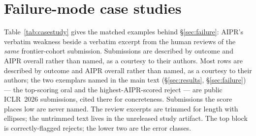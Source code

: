 \begin{table}[h]
  \centering
  \caption{Direct (GPT-5.4) vs.\ AIPR (GPT-5.4) on the frontier
  cohort (same model, same PDF): discrimination (AUROC), accept/reject agreement
  at AIPR@60 (balanced accuracy), and run-to-run reliability (median within-paper
  SD).}
  \label{tab:naive}
  
\end{table}

\section{Failure-mode case studies}
\label{app:cases}
Table~\ref{tab:casestudy} gives the matched examples behind \S\ref{sec:failure}:
AIPR's verbatim weakness beside a verbatim excerpt from the human reviews of the
\emph{same} frontier-cohort submission. \ifanonymous Submissions are described by
outcome and AIPR overall rather than named, as a courtesy to their authors.\else
Most rows are described by outcome and AIPR overall rather than named, as a
courtesy to their authors; the two exemplars named in the main text
(\S\ref{sec:results}, \S\ref{sec:failure}) --- the top-scoring oral and the
highest-AIPR-scored reject --- are public ICLR~2026 submissions, cited there for
concreteness. Submissions the score places low are never named.\fi{} The review excerpts are trimmed for length with
ellipses; the untrimmed text lives in the unreleased study artifact. The top block is correctly-flagged rejects; the lower two
are the error classes.

